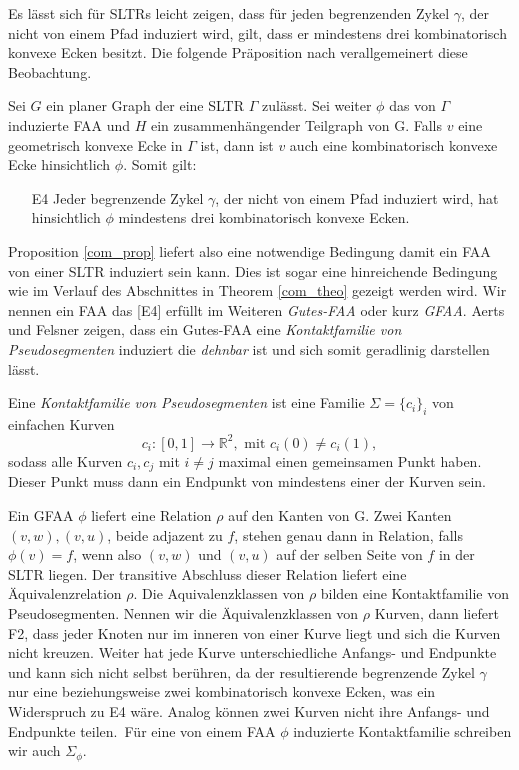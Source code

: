 Es lässt sich für SLTRs leicht zeigen, dass für jeden begrenzenden Zykel $\gamma$, der nicht von einem Pfad induziert wird, gilt, dass er mindestens drei kombinatorisch konvexe Ecken besitzt. Die folgende Präposition nach \cite[Prop 2.2, Prop 2.4]{af13} verallgemeinert diese Beobachtung.

\begin{proposition}\label{com_prop}
Sei $G$ ein planer Graph der eine SLTR $\Gamma$ zulässt. Sei weiter $\phi$ das von $\Gamma$ induzierte FAA und $H$ ein zusammenhängender Teilgraph von G. Falls $v$ eine geometrisch konvexe Ecke in $\Gamma$ ist, dann ist $v$ auch eine kombinatorisch konvexe Ecke hinsichtlich $\phi$. Somit gilt:
\begin{itemize}
\item [E4] Jeder begrenzende Zykel $\gamma$, der nicht von einem Pfad induziert wird, hat hinsichtlich $\phi$ mindestens drei kombinatorisch konvexe Ecken.
\end{itemize}

\end{proposition}

Proposition \ref{com_prop} liefert also eine notwendige Bedingung damit ein FAA von einer SLTR induziert sein kann. Dies ist sogar eine hinreichende Bedingung wie im Verlauf des Abschnittes in Theorem \ref{com_theo} gezeigt werden wird. Wir nennen ein FAA das [E4] erfüllt im Weiteren \textit{Gutes-FAA} oder kurz \textit{GFAA}. Aerts und Felsner zeigen, dass ein Gutes-FAA eine \textit{Kontaktfamilie von Pseudosegmenten} induziert die \textit{dehnbar} ist und sich somit geradlinig darstellen lässt.

\begin{definition}

Eine \textit{Kontaktfamilie von Pseudosegmenten} ist eine Familie $\Sigma = \{c_i\}_i$ von einfachen Kurven $$c_i:[0,1] \to \mathbb{R}^2, \text{ mit } c_i(0) \neq c_i(1),$$ sodass alle Kurven $c_i,c_j$ mit $i \neq j$ maximal einen gemeinsamen Punkt haben. Dieser Punkt muss dann ein Endpunkt von mindestens einer der Kurven sein.

\end{definition}

Ein GFAA $\phi$ liefert eine Relation $\rho$ auf den Kanten von G. Zwei Kanten $(v,w),(v,u)$, beide adjazent zu $f$, stehen genau dann in Relation, falls $\phi(v)=f$, wenn also $(v,w)$ und $(v,u)$ auf der selben Seite von $f$ in der SLTR liegen. Der transitive Abschluss dieser Relation liefert eine Äquivalenzrelation $\rho$. Die Aquivalenzklassen von $\rho$ bilden eine Kontaktfamilie von Pseudosegmenten. Nennen wir die Äquivalenzklassen von $\rho$ Kurven, dann liefert F2, dass jeder Knoten nur im inneren von einer Kurve liegt und sich die Kurven nicht kreuzen. Weiter hat jede Kurve unterschiedliche Anfangs- und Endpunkte und kann sich nicht selbst berühren, da der resultierende begrenzende Zykel $\gamma$ nur eine beziehungsweise zwei kombinatorisch konvexe Ecken, was ein Widerspruch zu E4 wäre. Analog können zwei Kurven nicht ihre Anfangs- und Endpunkte teilen.\
Für eine von einem FAA $\phi$ induzierte Kontaktfamilie schreiben wir auch $\Sigma_{\phi}$.

